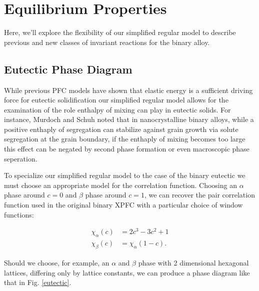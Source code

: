 \documentclass[showkeys, prb, reprint]{revtex4-1}
\begin{document}
\section{Equilibrium Properties}

Here, we'll explore the flexibility of our simplified regular model to describe previous and new classes of invariant reactions for the binary alloy.

\subsection{Eutectic Phase Diagram}

While previous PFC models have shown that elastic energy is a sufficient driving force for eutectic solidification our simplified regular model allows for the examination of the role enthalpy of mixing can play in eutectic solids. For instance, Murdoch and Schuh noted that in nanocrystalline binary alloys, while a positive enthaply of segregation can stabilize against grain growth via solute segregation at the grain boundary, if the enthaply of mixing becomes too large this effect can be negated by second phase formation or even macroscopic phase seperation\cite{murdoch}. 

To specialize our simplified regular model to the case of the binary eutectic we must choose an appropriate model for the correlation function. Choosing an $\alpha$ phase around $c = 0$ and $\beta$ phase around $c = 1$, we can recover the pair correlation function used in the original binary XPFC with a particular choice of window functions: 

\begin{align}
   \chi_\alpha(c) &= 2c^3 - 3c^2 + 1 \\
   \chi_\beta(c) &= \chi_\alpha(1 - c).
\end{align}

Should we choose, for example, an $\alpha$ and $\beta$ phase with 2 dimensional hexagonal lattices, differing only by lattice constants, we can produce a phase diagram like that in Fig. \ref{eutectic}.  
\end{document}
